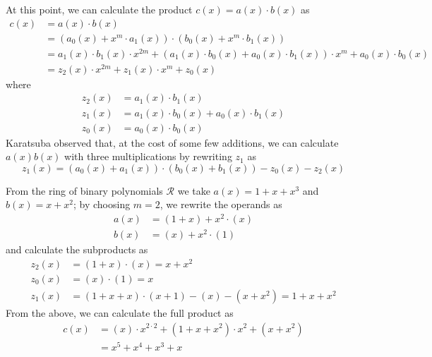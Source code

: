 At this point, we can calculate the product $c(x) = a(x)\cdot b(x)$ as
\begin{equation*}
    \begin{aligned}
        c(x) &= a(x)\cdot b(x) \\
             &= (a_0(x) + x^m\cdot  a_1(x))\cdot (b_0(x) + x^m\cdot  b_1(x)) \\
             &= a_1(x)\cdot b_1(x)\cdot x^{2m} + (a_1(x)\cdot b_0(x) + a_0(x)\cdot b_1(x))\cdot x^m + a_0(x)\cdot b_0(x)\\
             &= z_2(x)\cdot x^{2m} + z_1(x)\cdot x^m + z_0(x)
    \end{aligned}
\end{equation*}
where
\begin{equation*}
    \begin{aligned}
        z_2(x) &= a_1(x)\cdot b_1(x) \\
        z_1(x) &= a_1(x)\cdot b_0(x) + a_0(x)\cdot b_1(x) \\
        z_0(x) &= a_0(x)\cdot b_0(x)
    \end{aligned}
\end{equation*}
Karatsuba observed that, at the cost of some few additions, we can calculate $a(x)b(x)$ with three multiplications by rewriting $z_1$ as
\begin{equation*}
    z_1(x) = (a_0(x) + a_1(x))\cdot (b_0(x) + b_1(x)) - z_0(x) - z_2(x)
\end{equation*}

\begin{example}
From the ring of binary polynomials $\mathcal{R}$ we take $a(x) = 1 + x + x^3$ and $b(x) = x + x^2$; by choosing $m=2$, we rewrite the operands as
\begin{equation*}
    \begin{aligned}
        a(x) &= (1+x) + x^2\cdot (x)\\
        b(x) &= (x) + x^2\cdot (1)
    \end{aligned}
\end{equation*}
and calculate the subproducts as
\begin{equation*}
    \begin{aligned}
        z_2(x) &= (1+x)\cdot (x) = x + x^2 \\
        z_0(x) &= (x)\cdot (1) = x \\
        z_1(x) &= (1+x + x)\cdot (x + 1) - (x) - (x+x^2) = 1 + x + x^2
    \end{aligned}
\end{equation*}
From the above, we can calculate the full product as
\begin{equation*}
    \begin{aligned}
        c(x) &= (x)\cdot x^{2\cdot 2} + (1 + x + x^2)\cdot x^2 + (x+x^2) \\
             &= x^5 + x^4 + x^3 + x
    \end{aligned}
\end{equation*}
\end{example}

